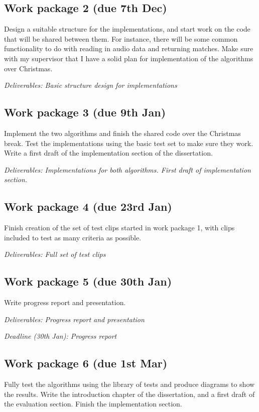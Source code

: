 \documentclass[12pt]{article}
\begin{document}
\subsection*{Work package 2 (due 7th Dec)}
Design a suitable structure for the implementations, and start work on the code that will be shared between them. For instance, there will be some common functionality to do with reading in audio data and returning matches. Make sure with my supervisor that I have a solid plan for implementation of the algorithms over Christmas.

\emph{Deliverables: Basic structure design for implementations}

\subsection*{Work package 3 (due 9th Jan)}
Implement the two algorithms and finish the shared code over the Christmas break. Test the implementations using the basic test set to make sure they work. Write a first draft of the implementation section of the dissertation.

\emph{Deliverables: Implementations for both algorithms. First draft of implementation section.}

\subsection*{Work package 4 (due 23rd Jan)}
Finish creation of the set of test clips started in work package 1, with clips included to test as many criteria as possible.

\emph{Deliverables: Full set of test clips}

\subsection*{Work package 5 (due 30th Jan)}
Write progress report and presentation.

\emph{Deliverables: Progress report and presentation}

\emph{Deadline (30th Jan): Progress report}

\subsection*{Work package 6 (due 1st Mar)}
Fully test the algorithms using the library of tests and produce diagrams to show the results. Write the introduction chapter of the dissertation, and a first draft of the evaluation section. Finish the implementation section.
\end{document}
